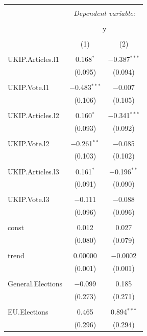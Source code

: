 \documentclass[12pt,article]{article}
\begin{document}
\begin{table}[!htbp] \centering 
  \caption{} 
  \label{} 
\begin{tabular}{@{\extracolsep{5pt}}lcc} 
\\[-1.8ex]\hline 
\hline \\[-1.8ex] 
 & \multicolumn{2}{c}{\textit{Dependent variable:}} \\ 
\cline{2-3} 
\\[-1.8ex] & \multicolumn{2}{c}{y} \\ 
\\[-1.8ex] & (1) & (2)\\ 
\hline \\[-1.8ex] 
 UKIP.Articles.l1 & 0.168$^{*}$ & $-$0.387$^{***}$ \\ 
  & (0.095) & (0.094) \\ 
  & & \\ 
 UKIP.Vote.l1 & $-$0.483$^{***}$ & $-$0.007 \\ 
  & (0.106) & (0.105) \\ 
  & & \\ 
 UKIP.Articles.l2 & 0.160$^{*}$ & $-$0.341$^{***}$ \\ 
  & (0.093) & (0.092) \\ 
  & & \\ 
 UKIP.Vote.l2 & $-$0.261$^{**}$ & $-$0.085 \\ 
  & (0.103) & (0.102) \\ 
  & & \\ 
 UKIP.Articles.l3 & 0.161$^{*}$ & $-$0.196$^{**}$ \\ 
  & (0.091) & (0.090) \\ 
  & & \\ 
 UKIP.Vote.l3 & $-$0.111 & $-$0.088 \\ 
  & (0.096) & (0.096) \\ 
  & & \\ 
 const & 0.012 & 0.027 \\ 
  & (0.080) & (0.079) \\ 
  & & \\ 
 trend & 0.00000 & $-$0.0002 \\ 
  & (0.001) & (0.001) \\ 
  & & \\ 
 General.Elections & $-$0.099 & 0.185 \\ 
  & (0.273) & (0.271) \\ 
  & & \\ 
 EU.Elections & 0.465 & 0.894$^{***}$ \\ 
  & (0.296) & (0.294) \\ 

\end{tabular}
\end{table}
\end{document}
